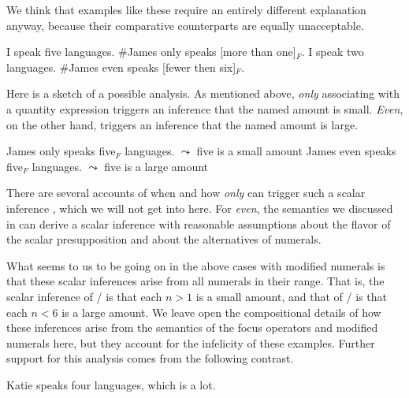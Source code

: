\documentclass[output=paper]{langscibook}
\begin{document}
We think that examples like these require an entirely different explanation anyway, because their comparative counterparts are equally unacceptable.

\ea
  \ea I speak five languages. \#James only speaks [more than one]$_F$.\label{don-sud:onlymore}
  \ex I speak two languages. \#James even speaks [fewer then six]$_F$.\label{don-sud:evenfewer}
  \z
\z

\noindent Here is a sketch of a possible analysis. As mentioned above, \textit{only} associating with a quantity expression triggers an inference that the named amount is small. \textit{Even}, on the other hand, triggers an inference that the named amount is large.

\ea
  \ea James only speaks five$_F$ languages.
  \hfill $\leadsto$ five is a small amount
  \ex James even speaks five$_F$ languages.
  \hfill $\leadsto$ five is a large amount
  \z
\z

\noindent There are several accounts of when and how \textit{only} can trigger such a scalar inference \citep{grosz, coppockbeaver, alxatib}, which we will not get into here. For \textit{even}, the semantics we discussed in  can derive a scalar inference with reasonable assumptions about the flavor of the scalar presupposition and about the alternatives of numerals.

What seems to us to be going on in the above cases with modified numerals is that these scalar inferences arise from all numerals in their range. That is, the scalar inference of / is that each $n>1$ is a small amount, and that of / is that each $n<6$ is a large amount. We leave open the compositional details of how these inferences arise from the semantics of the focus operators and modified numerals here, but they account for the infelicity of these examples. Further support for this analysis comes from the following contrast.

\ea Katie speaks four languages, which is a lot.
  \z
\z

{\sloppy\printbibliography[heading=subbibliography,notkeyword=this]}
\end{document}

